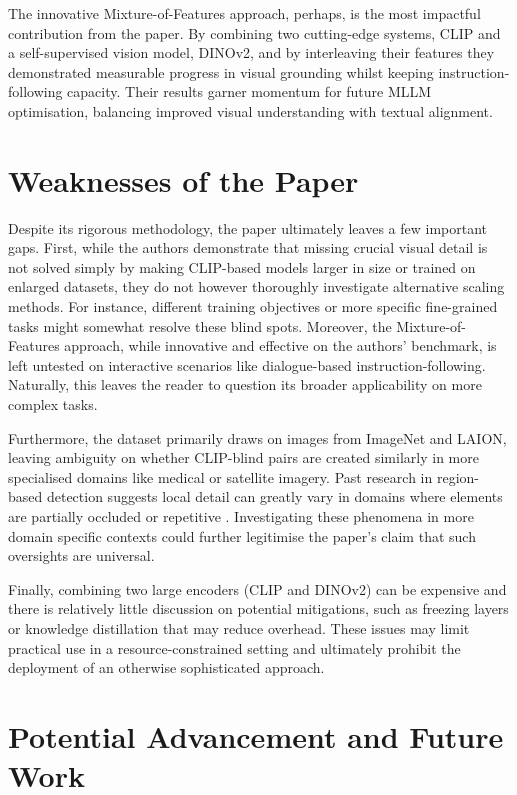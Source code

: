 \documentclass[11pt]{article}
\begin{document}
The innovative Mixture-of-Features approach, perhaps, is the most impactful contribution from the paper. By combining two cutting-edge systems, CLIP and a self-supervised vision model, DINOv2, and by interleaving their features they demonstrated measurable progress in visual grounding whilst keeping instruction-following capacity.
Their results garner momentum for future MLLM optimisation, balancing improved visual understanding with textual alignment.

\section*{Weaknesses of the Paper}

Despite its rigorous methodology, the paper ultimately leaves a few important gaps. First, while the authors demonstrate that missing crucial visual detail is not solved simply by making CLIP-based models larger in size or trained on enlarged datasets, they do not however thoroughly investigate alternative scaling methods.
For instance, different training objectives or more specific fine-grained tasks might somewhat resolve these blind spots. Moreover, the Mixture-of-Features approach, while innovative and effective on the authors' benchmark, is left untested on interactive scenarios like dialogue-based instruction-following. Naturally, this leaves the reader to question its broader applicability on more complex tasks.

Furthermore, the dataset primarily draws on images from ImageNet and LAION, leaving ambiguity on whether CLIP-blind pairs are created similarly in more specialised domains like medical or satellite imagery. Past research in region-based detection suggests local detail can greatly vary in domains where elements are partially occluded or repetitive \cite{Girshick2014CVPR}.
Investigating these phenomena in more domain specific contexts could further legitimise the paper's claim that such oversights are universal.

Finally, combining two large encoders (CLIP and DINOv2) can be expensive and there is relatively little discussion on potential mitigations, such as freezing layers or knowledge distillation that may reduce overhead. These issues may limit practical use in a resource-constrained setting and ultimately prohibit the deployment of an otherwise sophisticated approach.

\section*{Potential Advancement and Future Work}
\end{document}
